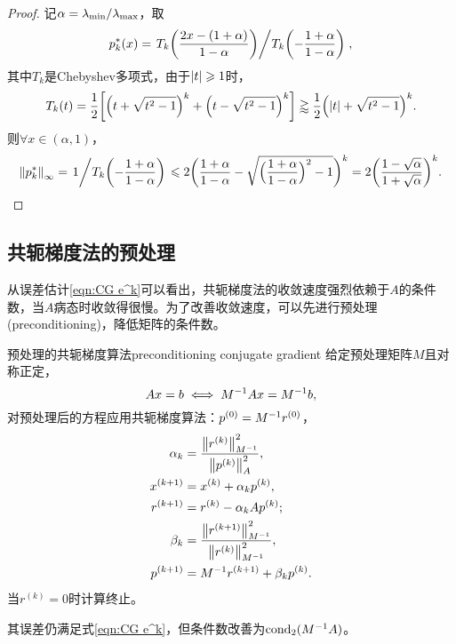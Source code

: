 \begin{proof}
    记$\alpha=\lambda_\mathrm{min}/\lambda_\mathrm{max}$，取
    \[
        p_k^*(x)=\left.{T_k\biggl(\frac{2x-(1+\alpha)}{1-\alpha}\biggr)}\middle/{T_k\biggl(-\frac{1+\alpha}{1-\alpha}\biggr)}\right.,
    \]
    其中$T_k$是Chebyshev多项式，由于$\left\lvert t\right\rvert\geqslant 1$时，
    \[
        T_k(t)=\frac12\biggl[\Bigl(t+\sqrt{t^2-1}\Bigr)^k+\Bigl(t-\sqrt{t^2-1}\Bigr)^k\biggr]\gtrapprox \frac12\Bigl(\left\lvert t\right\rvert+\sqrt{t^2-1}\Bigr)^k.
    \]
    则$\forall x\in(\alpha,1)$，
    \[
        \left\lVert p_k^*\right\rVert_\infty=\left.{1}\middle/{T_k\biggl(-\frac{1+\alpha}{1-\alpha}\biggr)}\right.\leqslant 2\biggl(\frac{1+\alpha}{1-\alpha}-\sqrt{\Bigl(\frac{1+\alpha}{1-\alpha}\Bigr)^2-1}\biggr)^k=2\biggl(\frac{1-\sqrt\alpha}{1+\sqrt\alpha}\biggr)^k.
        \qedhere
    \]
\end{proof}

\subsection{共轭梯度法的预处理}
\label{ssec:preconditioning}

从误差估计\eqref{eqn:CG e^k}可以看出，共轭梯度法的收敛速度强烈依赖于$A$的条件数，当$A$病态时收敛得很慢。为了改善收敛速度，可以先进行预处理(preconditioning)，降低矩阵的条件数。

\begin{theorem}
    {预处理的共轭梯度算法}{preconditioning conjugate gradient}
    给定预处理矩阵$M$且对称正定，
    \[
        Ax=b\iff M^{-1} Ax=M^{-1} b,
    \]
    对预处理后的方程应用共轭梯度算法：$p^{(0)}=M^{-1} r^{(0)}$，
    \begin{subequations}
        \begin{align}
            \alpha_k&=\frac{\left\lVert r^{(k)}\right\rVert_{M^{-1}}^2}{\left\lVert p^{(k)}\right\rVert_A^2},\\
            x^{(k+1)}&=x^{(k)}+\alpha_kp^{(k)},\\
            r^{(k+1)}&=r^{(k)}-\alpha_kAp^{(k)};\\
            \beta_k&=\frac{\left\lVert r^{(k+1)}\right\rVert_{M^{-1}}^2}{\left\lVert r^{(k)}\right\rVert_{M^{-1}}^2},\\
            p^{(k+1)}&=M^{-1} r^{(k+1)}+\beta_kp^{(k)}.
        \end{align}
    \end{subequations}
    当$r^{(k)}=0$时计算终止。
\end{theorem}

\begin{corollary}
    其误差仍满足式\eqref{eqn:CG e^k}，但条件数改善为$\operatorname{cond}_2(M^{-1} A)$。
\end{corollary}

